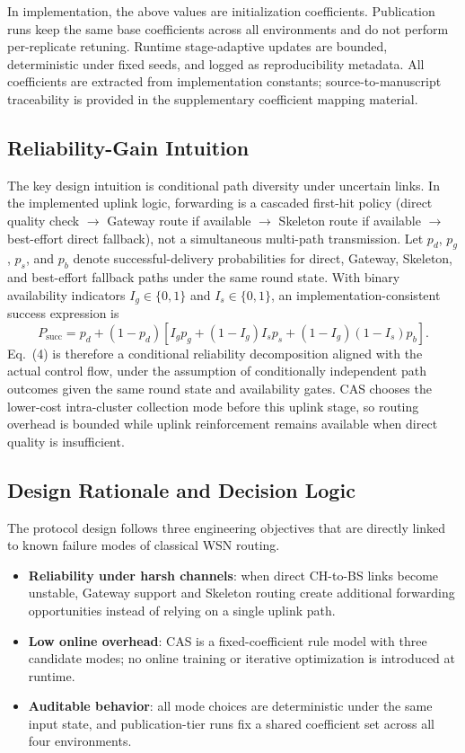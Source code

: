 ﻿\documentclass[sensors,article,submit,moreauthors,pdftex]{Definitions/mdpi}
\begin{document}
In implementation, the above values are initialization coefficients. Publication runs keep the same base coefficients across all environments and do not perform per-replicate retuning. Runtime stage-adaptive updates are bounded, deterministic under fixed seeds, and logged as reproducibility metadata. All coefficients are extracted from implementation constants; source-to-manuscript traceability is provided in the supplementary coefficient mapping material.

\subsection{Reliability-Gain Intuition}
The key design intuition is conditional path diversity under uncertain links. In the implemented uplink logic, forwarding is a cascaded first-hit policy (direct quality check \(\rightarrow\) Gateway route if available \(\rightarrow\) Skeleton route if available \(\rightarrow\) best-effort direct fallback), not a simultaneous multi-path transmission. Let \(p_d\), \(p_g\), \(p_s\), and \(p_b\) denote successful-delivery probabilities for direct, Gateway, Skeleton, and best-effort fallback paths under the same round state. With binary availability indicators \(I_g\in\{0,1\}\) and \(I_s\in\{0,1\}\), an implementation-consistent success expression is
\begin{equation}
P_{\mathrm{succ}} = p_d + (1-p_d)\left[I_g p_g + (1-I_g)I_s p_s + (1-I_g)(1-I_s)p_b\right].
\end{equation}
Eq.~(4) is therefore a conditional reliability decomposition aligned with the actual control flow, under the assumption of conditionally independent path outcomes given the same round state and availability gates. CAS chooses the lower-cost intra-cluster collection mode before this uplink stage, so routing overhead is bounded while uplink reinforcement remains available when direct quality is insufficient.

\subsection{Design Rationale and Decision Logic}
The protocol design follows three engineering objectives that are directly linked to known failure modes of classical WSN routing.
\begin{itemize}
\item \textbf{Reliability under harsh channels}: when direct CH-to-BS links become unstable, Gateway support and Skeleton routing create additional forwarding opportunities instead of relying on a single uplink path.
\item \textbf{Low online overhead}: CAS is a fixed-coefficient rule model with three candidate modes; no online training or iterative optimization is introduced at runtime.
\item \textbf{Auditable behavior}: all mode choices are deterministic under the same input state, and publication-tier runs fix a shared coefficient set across all four environments.
\end{itemize}
\end{document}
